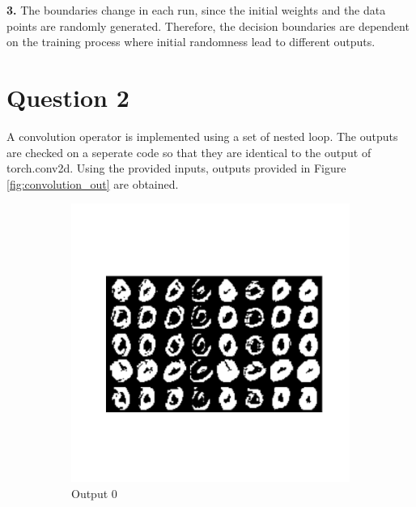 \documentclass{assignment}
\begin{document}
\textbf{3.}
The boundaries change in each run, since the initial weights and the data points are randomly generated. Therefore, the decision boundaries are dependent on the training process where initial randomness lead to different outputs.


\section{Question 2}
A convolution operator is implemented using a set of nested loop. The outputs are checked on a seperate code so that they are identical to the output of torch.conv2d. Using the provided inputs, outputs provided in Figure \ref{fig:convolution_out} are obtained.


\begin{figure}[htbp!]
    \begin{subfigure}{0.3\textwidth}
        \includegraphics[width=\textwidth]{figures/out_0.png}
        \caption{Output 0}
    \end{subfigure}\hfill
    \begin{subfigure}{0.3\textwidth}

\end{subfigure}
\end{figure}
\end{document}
